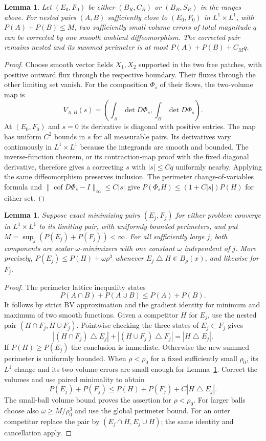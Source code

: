 \documentclass[11pt,reqno]{amsart}
\numberwithin{equation}{section}
\newtheorem{lemma}[theorem]{Lemma}
\theoremstyle{definition}
\theoremstyle{remark}
\newcommand{\symdiff}{\mathbin{\triangle}}
\begin{document}
\begin{lemma}\label{lem:flow}
Let $(E_0,F_0)$ be either $(B_R,C_R)$ or $(B_R,S_R)$ in the ranges above.
For nested pairs $(A,B)$ sufficiently close to $(E_0,F_0)$ in
$L^1\times L^1$, with $P(A)+P(B)\le M$, two sufficiently small
volume errors of total magnitude $q$ can be corrected by one smooth
ambient diffeomorphism. The corrected pair remains nested and its
summed perimeter is at most $P(A)+P(B)+C_Mq$.
\end{lemma}
\begin{proof}
Choose smooth vector fields $X_1,X_2$ supported in the two free patches,
with positive outward flux through the respective boundary. Their
fluxes through the other limiting set vanish. For the composition
$\Phi_s$ of their flows, the two-volume map is
\[
 V_{A,B}(s)=\left(\int_A\det D\Phi_s,\int_B\det D\Phi_s\right).
\]
At $(E_0,F_0)$ and $s=0$ its derivative is diagonal with positive
entries. The map has uniform $C^2$ bounds in $s$ for all measurable
pairs. Its derivatives vary continuously in $L^1\times L^1$ because
the integrands are smooth and bounded. The inverse-function theorem,
or its contraction-map proof with the fixed diagonal derivative,
therefore gives a correcting $s$ with $|s|\le Cq$ uniformly nearby.
Applying the same diffeomorphism preserves inclusion. The perimeter
change-of-variables formula and $\|\operatorname{cof}D\Phi_s-I\|_\infty
\le C|s|$ give $P(\Phi_s H)\le(1+C|s|)P(H)$ for either set.
\end{proof}

\begin{lemma}\label{lem:quasi}
Suppose exact minimizing pairs $(E_j,F_j)$ for either problem converge
in $L^1\times L^1$ to its limiting pair, with uniformly bounded
perimeters, and put $M=\sup_j(P(E_j)+P(F_j))<\infty$.
For all sufficiently large $j$, both components are scalar
$\omega$-minimizers with one constant $\omega$ independent of $j$.
More precisely,
$P(E_j)\le P(H)+\omega\rho^3$ whenever
$E_j\symdiff H\Subset B_\rho(x)$, and likewise for $F_j$.
\end{lemma}
\begin{proof}
The perimeter lattice inequality states
\[
 P(A\cap B)+P(A\cup B)\le P(A)+P(B).
\]
It follows by strict BV approximation and the gradient identity for
minimum and maximum of two smooth functions. Given a competitor $H$
for $E_j$, use the nested pair $(H\cap F_j,H\cup F_j)$. Pointwise
checking the three states of $E_j\subset F_j$ gives
\[
 |(H\cap F_j)\symdiff E_j|+|(H\cup F_j)\symdiff F_j|
 =|H\symdiff E_j|.
\]
If $P(H)\ge P(E_j)$ the conclusion is immediate. Otherwise the new
summed perimeter is uniformly bounded. When $\rho<\rho_0$ for a
fixed sufficiently small $\rho_0$, its $L^1$ change and its two volume
errors are small enough for Lemma~\ref{lem:flow}. Correct the volumes
and use paired minimality to obtain
\[
 P(E_j)+P(F_j)\le P(H)+P(F_j)+C|H\symdiff E_j|.
\]
The small-ball volume bound proves the assertion for $\rho<\rho_0$.
For larger balls choose also $\omega\ge M/\rho_0^3$ and use the
global perimeter bound. For an outer competitor replace the pair by
$(E_j\cap H,E_j\cup H)$; the same identity and cancellation apply.
\end{proof}
\end{document}
